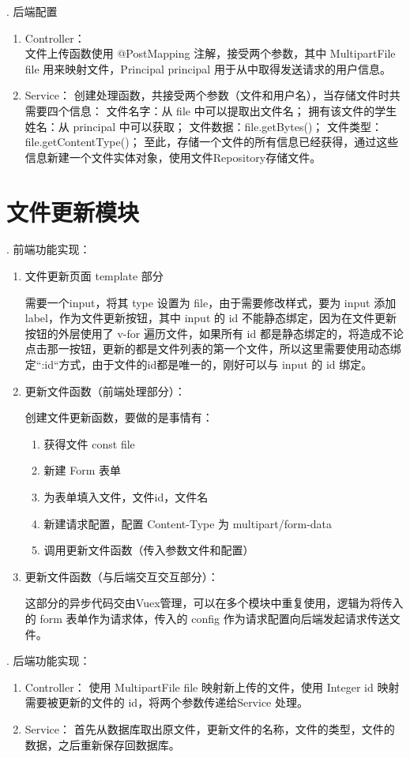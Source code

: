 . 后端配置

\begin{enumerate}
  \item Controller：\\
        文件上传函数使用 @PostMapping 注解，接受两个参数，其中 MultipartFile file 用来映射文件，Principal principal 用于从中取得发送请求的用户信息。
  \item Service：
        创建处理函数，共接受两个参数（文件和用户名），当存储文件时共需要四个信息：
        文件名字：从 file 中可以提取出文件名；
        拥有该文件的学生姓名：从 principal 中可以获取；
        文件数据：file.getBytes()；
        文件类型：file.getContentType()；
        至此，存储一个文件的所有信息已经获得，通过这些信息新建一个文件实体对象，使用文件Repository存储文件。
\end{enumerate}

\section{文件更新模块}

. 前端功能实现：
\begin{enumerate}[label=\circled{\arabic*}]
  \item 文件更新页面 template 部分

        需要一个input，将其 type 设置为 file，由于需要修改样式，要为 input 添加 label，作为文件更新按钮，其中 input 的 id 不能静态绑定，因为在文件更新按钮的外层使用了 v-for 遍历文件，如果所有 id 都是静态绑定的，将造成不论点击那一按钮，更新的都是文件列表的第一个文件，所以这里需要使用动态绑定“:id“方式，由于文件的id都是唯一的，刚好可以与 input 的 id 绑定。
  \item 更新文件函数（前端处理部分）：

        创建文件更新函数，要做的是事情有：
        \begin{enumerate}
          \item 获得文件 const file
          \item 新建 Form 表单
          \item 为表单填入文件，文件id，文件名
          \item 新建请求配置，配置 Content-Type 为 multipart/form-data
          \item 调用更新文件函数（传入参数文件和配置）
        \end{enumerate}
  \item 更新文件函数（与后端交互交互部分）：

        这部分的异步代码交由Vuex管理，可以在多个模块中重复使用，逻辑为将传入的 form 表单作为请求体，传入的 config 作为请求配置向后端发起请求传送文件。
\end{enumerate}
. 后端功能实现：
\begin{enumerate}
  \item Controller：
        使用 MultipartFile file 映射新上传的文件，使用 Integer id 映射需要被更新的文件的 id，将两个参数传递给Service 处理。
  \item Service：
        首先从数据库取出原文件，更新文件的名称，文件的类型，文件的数据，之后重新保存回数据库。
\end{enumerate}


